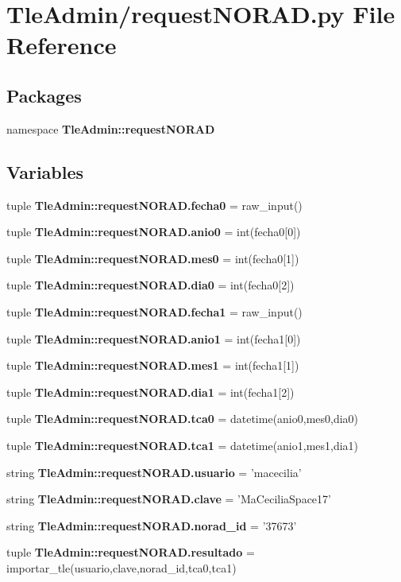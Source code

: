 \section{\-Tle\-Admin/request\-N\-O\-R\-A\-D.py \-File \-Reference}
\label{request_n_o_r_a_d_8py}
\subsection*{\-Packages}
\begin{DoxyCompactItemize}
\item 
namespace {\bf \-Tle\-Admin\-::request\-N\-O\-R\-A\-D}
\end{DoxyCompactItemize}
\subsection*{\-Variables}
\begin{DoxyCompactItemize}
\item 
tuple {\bf \-Tle\-Admin\-::request\-N\-O\-R\-A\-D.\-fecha0} = raw\-\_\-input()
\item 
tuple {\bf \-Tle\-Admin\-::request\-N\-O\-R\-A\-D.\-anio0} = int(fecha0[0])
\item 
tuple {\bf \-Tle\-Admin\-::request\-N\-O\-R\-A\-D.\-mes0} = int(fecha0[1])
\item 
tuple {\bf \-Tle\-Admin\-::request\-N\-O\-R\-A\-D.\-dia0} = int(fecha0[2])
\item 
tuple {\bf \-Tle\-Admin\-::request\-N\-O\-R\-A\-D.\-fecha1} = raw\-\_\-input()
\item 
tuple {\bf \-Tle\-Admin\-::request\-N\-O\-R\-A\-D.\-anio1} = int(fecha1[0])
\item 
tuple {\bf \-Tle\-Admin\-::request\-N\-O\-R\-A\-D.\-mes1} = int(fecha1[1])
\item 
tuple {\bf \-Tle\-Admin\-::request\-N\-O\-R\-A\-D.\-dia1} = int(fecha1[2])
\item 
tuple {\bf \-Tle\-Admin\-::request\-N\-O\-R\-A\-D.\-tca0} = datetime(anio0,mes0,dia0)
\item 
tuple {\bf \-Tle\-Admin\-::request\-N\-O\-R\-A\-D.\-tca1} = datetime(anio1,mes1,dia1)
\item 
string {\bf \-Tle\-Admin\-::request\-N\-O\-R\-A\-D.\-usuario} = 'macecilia'
\item 
string {\bf \-Tle\-Admin\-::request\-N\-O\-R\-A\-D.\-clave} = '\-Ma\-Cecilia\-Space17'
\item 
string {\bf \-Tle\-Admin\-::request\-N\-O\-R\-A\-D.\-norad\-\_\-id} = '37673'
\item 
tuple {\bf \-Tle\-Admin\-::request\-N\-O\-R\-A\-D.\-resultado} = importar\-\_\-tle(usuario,clave,norad\-\_\-id,tca0,tca1)
\end{DoxyCompactItemize}
